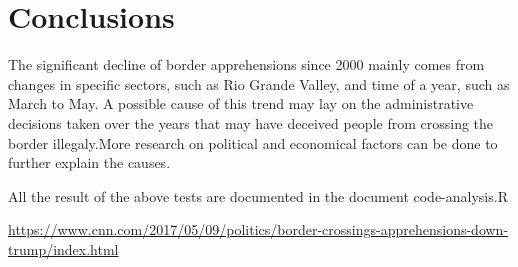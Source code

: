 \documentclass[journal, a4paper]{IEEEtran}
\begin{document}
	
	\section{Conclusions}
	The significant decline of border apprehensions since 2000 mainly comes from changes in specific sectors, such as Rio Grande Valley, and time of a year, such as March to May. A possible cause of this trend may lay on the administrative decisions taken over the years that may have deceived people from crossing the border illegaly.More research on political and economical factors can be done to further explain the causes.




	\begin{thebibliography}{5}
		
		
		
  	 All the result of the above tests are documented in the document code-analysis.R
	
     \url{https://www.cnn.com/2017/05/09/politics/border-crossings-apprehensions-down-trump/index.html}
		
	\end{thebibliography}
		
	
\end{document}
